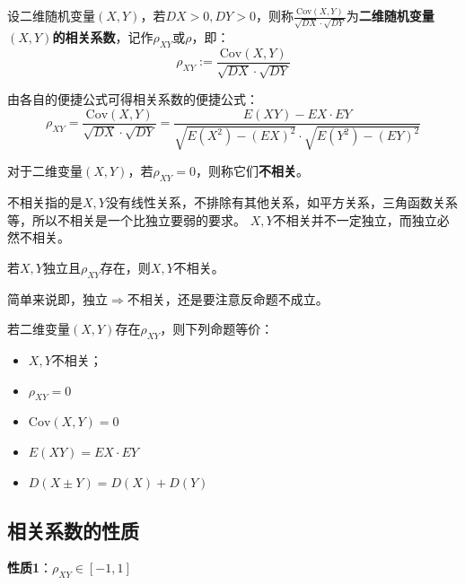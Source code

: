 \begin{definition}[相关系数]
设二维随机变量$\left( X,Y \right) $，若$DX>0,DY>0$，则称$\frac{\mathrm{Cov}\left( X,Y \right)}{\sqrt{DX}\cdot \sqrt{DY}}$为{\bf 二维随机变量$\left( X,Y \right) $的相关系数}，记作$\rho _{XY}$或$\rho $，即：
\[
\rho _{XY}:=\frac{\mathrm{Cov}\left( X,Y \right)}{\sqrt{DX}\cdot \sqrt{DY}}
\]
\end{definition}

由各自的便捷公式可得相关系数的便捷公式：
\[
\rho _{XY}=\frac{\mathrm{Cov}\left( X,Y \right)}{\sqrt{DX}\cdot \sqrt{DY}}=\frac{E\left( XY \right) -EX\cdot EY}{\sqrt{E\left( X^2 \right) -\left( EX \right) ^2}\cdot \sqrt{E\left( Y^2 \right) -\left( EY \right) ^2}}
\]

\begin{definition}[不相关]
对于二维变量$\left( X,Y \right) $，若$\rho _{XY}=0$，则称它们{\bf 不相关}。
\end{definition}

不相关指的是$X,Y$没有线性关系，不排除有其他关系，如平方关系，三角函数关系等，所以不相关是一个比独立要弱的要求。
$X,Y$不相关并不一定独立，而独立必然不相关。

\begin{theorem}
若$X,Y$独立且$\rho _{XY}$存在，则$X,Y$不相关。
\end{theorem}

简单来说即，独立$\Rightarrow $不相关，还是要注意反命题不成立。

\begin{theorem}
若二维变量$\left( X,Y \right) $存在$\rho _{XY}$，则下列命题等价：
\begin{itemize}
    \item $X,Y$不相关；
    \item $\rho _{XY}=0$
    \item $\mathrm{Cov}\left( X,Y \right) =0$
    \item $E\left( XY \right) =EX\cdot EY$
    \item $D\left( X\pm Y \right) =D\left( X \right) +D\left( Y \right) $
\end{itemize}
\end{theorem}

\subsection{相关系数的性质}

{\bf 性质1}：$\rho _{XY}\in \left[ -1,1 \right] $


